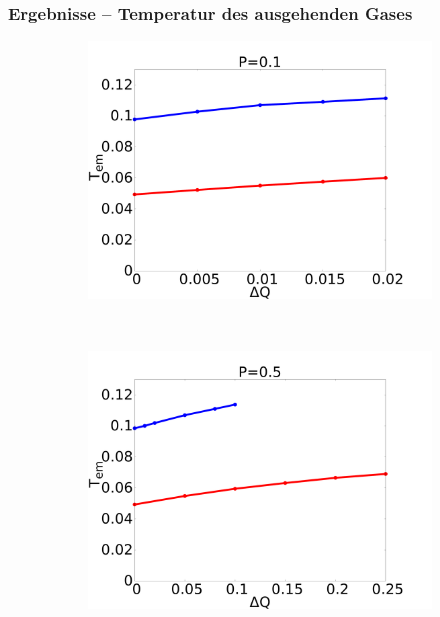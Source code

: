 \documentclass{beamer}
\begin{document}
\begin{frame}
\frametitle{Ergebnisse -- Temperatur des ausgehenden Gases}
\begin{figure}
    \begin{center}
        \begin{subfigure}[t]{0.3\textwidth}
            \includegraphics[scale=0.11]{../images/p01_out.pdf}
        \end{subfigure} 
        \
        \begin{subfigure}[t]{0.3\textwidth}
            \includegraphics[scale=0.11]{../images/p05_out.pdf}
        \end{subfigure} 
        \
        \begin{subfigure}[t]{0.3\textwidth}

\end{subfigure}
\end{center}
\end{figure}
\end{frame}
\end{document}
